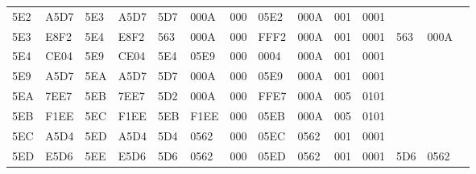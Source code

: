 \begin{tabular}{|*{14}{l|}}
5E2 & A5D7 & 5E3 & A5D7 & 5D7 & 000A & 000 & 05E2 & 000A & 001 & 0001 & &\\
5E3 & E8F2 & 5E4 & E8F2 & 563 & 000A & 000 & FFF2 & 000A & 001 & 0001 & 563 & 000A\\
5E4 & CE04 & 5E9 & CE04 & 5E4 & 05E9 & 000 & 0004 & 000A & 001 & 0001 & &\\
5E9 & A5D7 & 5EA & A5D7 & 5D7 & 000A & 000 & 05E9 & 000A & 001 & 0001 & &\\
5EA & 7EE7 & 5EB & 7EE7 & 5D2 & 000A & 000 & FFE7 & 000A & 005 & 0101 & &\\
5EB & F1EE & 5EC & F1EE & 5EB & F1EE & 000 & 05EB & 000A & 005 & 0101 & &\\
5EC & A5D4 & 5ED & A5D4 & 5D4 & 0562 & 000 & 05EC & 0562 & 001 & 0001 & &\\
5ED & E5D6 & 5EE & E5D6 & 5D6 & 0562 & 000 & 05ED & 0562 & 001 & 0001 & 5D6 & 0562\\\hline
\end{tabular}